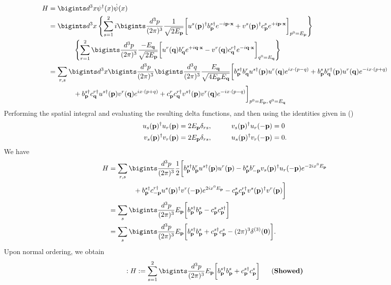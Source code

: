 \begin{align*}
    H&=\bigints d^3x\psi^\dagger(x)\Dot{\psi}(x)\notag\\
    &=\bigints d^3x\left\{\sum_{s=1}^2i\bigints\frac{d^3p}{(2\pi)^3}\frac{1}{\sqrt{2E_\mathbf{p}}}\bigg[u^{s}(\mathbf{p})^\dagger b_\mathbf{p}^{s\dagger}e^{-i\mathbf{p}\cdot\mathbf{x}}+v^s(\mathbf{p})^\dagger c_\mathbf{p}^{s}e^{+i\mathbf{p}\cdot\mathbf{x}}\bigg]_{p^0=E_\mathbf{p}}\right\}\notag\\
    &\qquad~~~~~\left\{\sum_{r=1}^2\bigints\frac{d^3p}{(2\pi)^3}\frac{-E_\mathbf{q}}{\sqrt{2E_\mathbf{p}}}\bigg[u^r(\mathbf{q})b_\mathbf{q}^re^{+i\mathbf{q}\cdot\mathbf{x}}-v^r(\mathbf{q})c_\mathbf{q}^{r\dagger}e^{-i\mathbf{q}\cdot\mathbf{x}}\bigg]_{q^0=E_\mathbf{q}}\right\}\notag\\
    &=\sum_{r,s}\bigints d^3x\bigints\frac{d^3p}{(2\pi)^3} \bigints\frac{d^3q}{(2\pi)^3}\frac{E_\mathbf{q}}{\sqrt{4E_\mathbf{p}E_\mathbf{q}}}\bigg[b_\mathbf{p}^{s\dagger}b_\mathbf{q}^{r}u^{s\dagger}(\mathbf{p})u^r(\mathbf{q})e^{ix\cdot(p-q)}+b_\mathbf{p}^sb_\mathbf{q}^{r\dagger}(\mathbf{p})u^r(\mathbf{q})e^{-ix\cdot(p+q)}\notag\\
    &\qquad~~~~~+b_\mathbf{p}^{s\dagger}c_\mathbf{q}^{r\dagger}u^{s\dagger}(\mathbf{p})v^r(\mathbf{q})e^{ix\cdot(p+q)}+c_\mathbf{p}^{r}c_\mathbf{q}^{r\dagger}v^{s\dagger}(\mathbf{p})v^r(\mathbf{q})e^{-ix\cdot(p-q)}\bigg]_{p^0=E_\mathbf{p},\,q^0=E_\mathbf{q}}
\end{align*}
Performing the spatial integral and evaluating the resulting delta functions, and then using the identities given in ()
\begin{align*}
    u_s(\mathbf{p})^\dagger u_r(\mathbf{p})=2E_\mathbf{p}\delta_{rs},&\qquad~~~v_s(\mathbf{p})^\dagger u_r(-\mathbf{p})=0\notag\\
    v_s(\mathbf{p})^\dagger v_r(\mathbf{p})=2E_\mathbf{p}\delta_{rs},&\qquad~~~u_s(\mathbf{p})^\dagger v_r(-\mathbf{p})=0.
\end{align*}
We have 
\begin{align}
    H&=\sum_{r,s}\bigints\frac{d^3p}{(2\pi)^3}\frac{1}{2}\bigg[b_\mathbf{p}^{s\dagger}b_\mathbf{p}^{r}u^{s\dagger}(\mathbf{p})u^r(\mathbf{p})-b_{\mathbf{p}}^sb_{-\mathbf{p}}^rv_s(\mathbf{p})^\dagger u_r(-\mathbf{p})e^{-2ix^0E_\mathbf{p}}\notag\\
    &\qquad~~~~~+b_\mathbf{p}^{s\dagger}c_{-\mathbf{p}}^{r\dagger}u^{s}(\mathbf{p})^\dagger v^r(-\mathbf{p})e^{2ix^0E_\mathbf{p}}-c_\mathbf{p}^{s}c_{\mathbf{p}}^{r\dagger}v^{s}(\mathbf{p})^\dagger v^r(\mathbf{p})\bigg]\notag\\
    &=\sum_s\bigints\frac{d^3p}{(2\pi)^3}E_\mathbf{p}\bigg[b_\mathbf{p}^{s\dagger}b_\mathbf{p}^s-c_\mathbf{p}^sc_\mathbf{p}^{s\dagger}\bigg]\label{eq:hamilton-step}\\
    &=\sum_s\bigints\frac{d^3p}{(2\pi)^3}E_\mathbf{p}\bigg[b_\mathbf{p}^{s\dagger}b_\mathbf{p}^s+c_\mathbf{p}^{s\dagger}c_\mathbf{p}^s-(2\pi)^3\delta^{(3)}(\mathbf{0})\bigg]\notag.
\end{align}
Upon normal ordering, we obtain
\begin{align}
    :H:=\sum_{s=1}^2\bigints\frac{d^3p}{(2\pi)^3}E_\mathbf{p}\bigg[b_\mathbf{p}^{s\dagger}b_\mathbf{p}^s+c_\mathbf{p}^{s\dagger}c_\mathbf{p}^s\bigg]~~~~~\text{(\bf Showed)}
\end{align}
